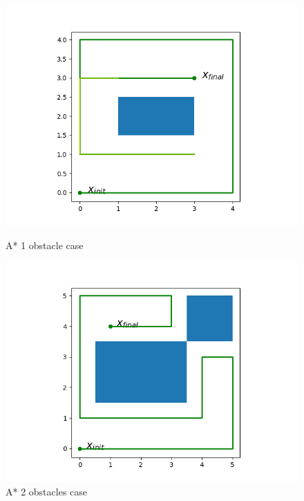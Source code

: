 \documentclass{article}
\begin{document}
\begin{normalsize}
\begin{figure}
\begin{minipage}{.33\textwidth}
      \includegraphics[width=\linewidth]{deliverables/Astar_output_1_obs.png} 
      \caption{A* 1 obstacle case}
    \end{minipage}%
    \begin{minipage}{.33\textwidth}
      \centering
      \includegraphics[width=\linewidth]{deliverables/Astar_output_2_obs.png}%
      \caption{A* 2 obstacles case}
    \end{minipage}
    \begin{minipage}{.33\textwidth}
      \centering

\end{minipage}
\end{figure}
\end{normalsize}
\end{document}
